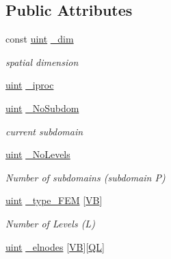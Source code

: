 \subsection*{Public Attributes}
\begin{DoxyCompactItemize}
\item 
const \mbox{\hyperlink{_typedefs_8hpp_a91ad9478d81a7aaf2593e8d9c3d06a14}{uint}} \mbox{\hyperlink{classfemus_1_1_multi_level_mesh_two_a0d43deb111e461db94315df3c8f6b0ed}{\+\_\+dim}}
\begin{DoxyCompactList}\small\item\em spatial dimension \end{DoxyCompactList}\item 
\mbox{\hyperlink{_typedefs_8hpp_a91ad9478d81a7aaf2593e8d9c3d06a14}{uint}} \mbox{\hyperlink{classfemus_1_1_multi_level_mesh_two_a2073adff4b7add5f6d88efa9d725bb35}{\+\_\+iproc}}
\item 
\mbox{\hyperlink{_typedefs_8hpp_a91ad9478d81a7aaf2593e8d9c3d06a14}{uint}} \mbox{\hyperlink{classfemus_1_1_multi_level_mesh_two_a345e33af17ea0c184dbf07285bb17d31}{\+\_\+\+No\+Subdom}}
\begin{DoxyCompactList}\small\item\em current subdomain \end{DoxyCompactList}\item 
\mbox{\hyperlink{_typedefs_8hpp_a91ad9478d81a7aaf2593e8d9c3d06a14}{uint}} \mbox{\hyperlink{classfemus_1_1_multi_level_mesh_two_a68f3f358a51963417fbaeb9255d2c2c3}{\+\_\+\+No\+Levels}}
\begin{DoxyCompactList}\small\item\em Number of subdomains (subdomain P) \end{DoxyCompactList}\item 
\mbox{\hyperlink{_typedefs_8hpp_a91ad9478d81a7aaf2593e8d9c3d06a14}{uint}} \mbox{\hyperlink{classfemus_1_1_multi_level_mesh_two_ac880a3845b674c89c531ebc387f6fa41}{\+\_\+type\+\_\+\+F\+EM}} \mbox{[}\mbox{\hyperlink{_v_b_type_enum_8hpp_a02ebcbc55b174d8bb6a65cddbe7f90b6}{VB}}\mbox{]}
\begin{DoxyCompactList}\small\item\em Number of Levels (L) \end{DoxyCompactList}\item 
\mbox{\hyperlink{_typedefs_8hpp_a91ad9478d81a7aaf2593e8d9c3d06a14}{uint}} \mbox{\hyperlink{classfemus_1_1_multi_level_mesh_two_a7da44ed973c45cc98c53369b60d61a5a}{\+\_\+elnodes}} \mbox{[}\mbox{\hyperlink{_v_b_type_enum_8hpp_a02ebcbc55b174d8bb6a65cddbe7f90b6}{VB}}\mbox{]}\mbox{[}\mbox{\hyperlink{_f_e_type_enum_8hpp_aca285339f9cf24489fdc0af5b51a5fde}{QL}}\mbox{]}

\end{DoxyCompactItemize}
